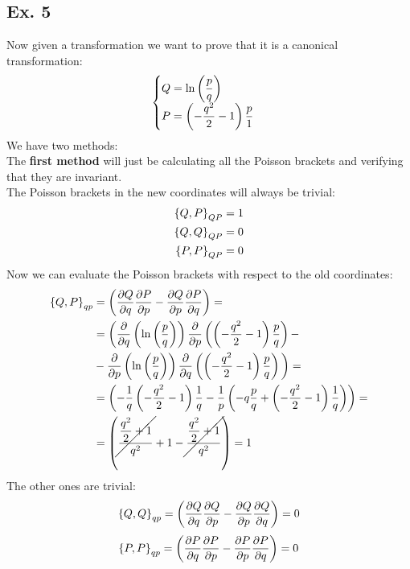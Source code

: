 \subsection{Ex. 5}
Now given a transformation we want to prove that it is a canonical transformation:
\begin{equation}
    \begin{cases}
        Q = \ln \left(\dfrac{p}{q}\right)\\
        P = \left(-\dfrac{q^2}{2}-1\right)\dfrac{p}{1}
    \end{cases}
\end{equation}
We have two methods:\\
The \textbf{first method} will just be calculating all the Poisson brackets and verifying that they are invariant.\\
The Poisson brackets in the new coordinates will always be trivial:
\begin{equation}
    \begin{split}
        \pb{Q}{P}_{QP} &= 1\\
        \pb{Q}{Q}_{QP} &= 0\\
        \pb{P}{P}_{QP} &= 0
    \end{split}
\end{equation}
Now we can evaluate the Poisson brackets with respect to the old coordinates:
\begin{equation}
    \begin{split}
        \pb{Q}{P}_{qp} &= \left(\pdv{Q}{q} \pdv{P}{p} - \pdv{Q}{p} \pdv{P}{q} \right) = \\
        &= \bbrackets{\pdv{}{q}\left(\ln\brackets{\dfrac{p}{q}}\right) \pdv{}{p}\left(\brackets{-\dfrac{q^2}{2}-1}\dfrac{p}{q}\right) -\\
        &- \pdv{}{p}\left(\ln\brackets{\dfrac{p}{q}}\right) \pdv{}{q}\left(\brackets{-\dfrac{q^2}{2}-1}\dfrac{p}{q}\right) } = \\
        &= \left(-\dfrac{1}{q}  \brackets{-\dfrac{q^2}{2}-1}  \dfrac{1}{q} - \dfrac{1}{p}  \brackets{-q  \dfrac{p}{q} + \brackets{-\dfrac{q^2}{2}-1}  \dfrac{1}{q}} \right) = \\
        &= \left(\cancel{\dfrac{\dfrac{q^2}{2} + 1}{q^2}} + 1 - \cancel{\dfrac{\dfrac{q^2}{2} + 1}{q^2}} \right) = 1
    \end{split}
\end{equation}
The other ones are trivial:
\begin{equation}
    \pb{Q}{Q}_{qp} = \left(\pdv{Q}{q} \pdv{Q}{p} - \pdv{Q}{p} \pdv{Q}{q} \right) = 0
\end{equation}
\begin{equation}
    \pb{P}{P}_{qp} = \left(\pdv{P}{q} \pdv{P}{p} - \pdv{P}{p} \pdv{P}{q} \right) = 0
\end{equation}

